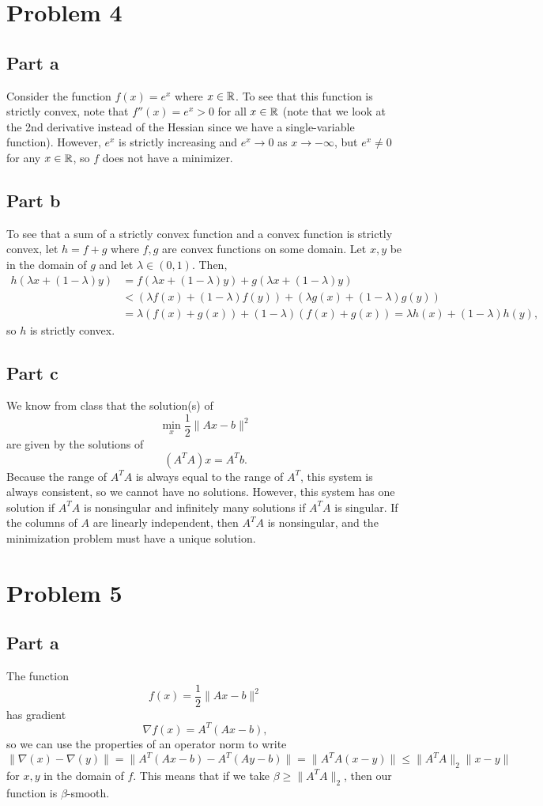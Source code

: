 \documentclass{article}
\begin{document}
\section{Problem 4}
\subsection{Part a}
Consider the function $f(x)=e^x$ where $x\in\mathbb{R}$. To see that this function is strictly convex, note that $f''(x)=e^x>0$ for all $x\in\mathbb{R}$ (note that we look at the 2nd derivative instead of the Hessian since we have a single-variable function). However, $e^x$ is strictly increasing and $e^x\to0$ as $x\to-\infty$, but $e^x\neq0$ for any $x\in\mathbb{R}$, so $f$ does not have a minimizer.

\subsection{Part b}
To see that a sum of a strictly convex function and a convex function is strictly convex, let $h=f+g$ where $f,g$ are convex functions on some domain. Let $x,y$ be in the domain of $g$ and let $\lambda\in(0,1)$. Then, 
\begin{align*}
h(\lambda x + (1-\lambda)y)&=f(\lambda x + (1-\lambda)y)+g(\lambda x + (1-\lambda)y)\\&
<(\lambda f(x) + (1-\lambda) f(y))+(\lambda g(x) + (1-\lambda) g(y))\\&
=\lambda(f(x)+g(x))+(1-\lambda)(f(x)+g(x))=\lambda h(x) + (1-\lambda) h(y),
\end{align*}
so $h$ is strictly convex. 
\subsection{Part c}
We know from class that the solution(s) of $$\min_x \frac{1}{2}\|Ax - b\|^2$$ are given by the solutions of 
\[
(A^TA)x=A^Tb.
\]
Because the range of $A^TA$ is always equal to the range of $A^T$, this system is always consistent, so we cannot have no solutions. However, this system has one solution if $A^TA$ is nonsingular and infinitely many solutions if $A^TA$ is singular. If the columns of $A$ are linearly independent, then $A^TA$ is nonsingular, and the minimization problem must have a unique solution.

\section{Problem 5}
\subsection{Part a}
The function $$f(x)=\frac{1}{2}\|Ax-b\|^2$$ has gradient $$\nabla f(x)=A^T(Ax-b),$$ so we can use the properties of an operator norm to write
\[
\|\nabla(x)-\nabla(y)\|=\|A^T(Ax-b)-A^T(Ay-b)\|=\|A^TA(x-y)\|\leq\|A^TA\|_2\|x-y\|
\]
for $x,y$ in the domain of $f$. This means that if we take $\beta\geq\|A^TA\|_2$, then our function is $\beta$-smooth.
\end{document}
